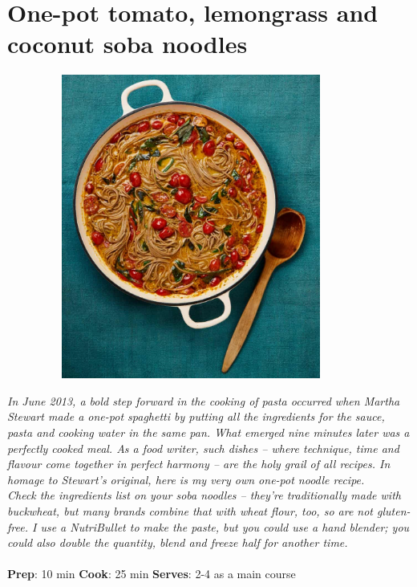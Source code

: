 \documentclass{book}
\begin{document}
\section{One-pot tomato, lemongrass and coconut soba noodles}
\begin{figure}
\centering\includegraphics[width=10cm,height=10cm,keepaspectratio]{Recipe_Pictures/One-pot_tomato,_lemongrass_and_coconut_soba_noodles.png}
\end{figure}
\emph{In June 2013, a bold step forward in the cooking of pasta occurred when Martha Stewart made a one-pot spaghetti by putting all the ingredients for the sauce, pasta and cooking water in the same pan. What emerged nine minutes later was a perfectly cooked meal. As a food writer, such dishes – where technique, time and flavour come together in perfect harmony – are the holy grail of all recipes. In homage to Stewart’s original, here is my very own one-pot noodle recipe.\\ 
Check the ingredients list on your soba noodles – they’re traditionally made with buckwheat, but many brands combine that with wheat flour, too, so are not gluten-free. I use a NutriBullet to make the paste, but you could use a hand blender; you could also double the quantity, blend and freeze half for another time.}\\\\ 
\textbf{Prep}: 10 min
\textbf{Cook}: 25 min
\textbf{Serves}: 2-4 as a main course
\end{document}
